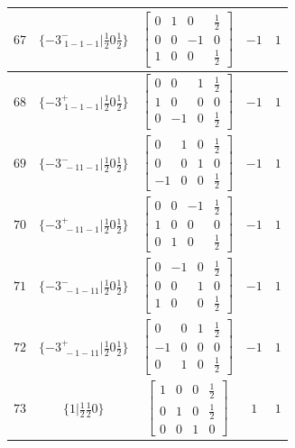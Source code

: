\documentclass[fleqn,8pt]{jsarticle}
\begin{document}
\begin{longtable}{ccccc}
$ 67 $ & $ \{-3^{-}_{\,\,1-1-1}|\frac{1}{2} 0 \frac{1}{2}\} $ & $ \begin{bmatrix} 0 & 1 & 0 & \frac{1}{2} \\ 0 & 0 & -1 & 0 \\ 1 & 0 & 0 & \frac{1}{2} \end{bmatrix} $ & $ -1 $ & $ 1 $ \\ \hline
$ 68 $ & $ \{-3^{+}_{\,\,1-1-1}|\frac{1}{2} 0 \frac{1}{2}\} $ & $ \begin{bmatrix} 0 & 0 & 1 & \frac{1}{2} \\ 1 & 0 & 0 & 0 \\ 0 & -1 & 0 & \frac{1}{2} \end{bmatrix} $ & $ -1 $ & $ 1 $ \\ \hline
$ 69 $ & $ \{-3^{-}_{\,\,-11-1}|\frac{1}{2} 0 \frac{1}{2}\} $ & $ \begin{bmatrix} 0 & 1 & 0 & \frac{1}{2} \\ 0 & 0 & 1 & 0 \\ -1 & 0 & 0 & \frac{1}{2} \end{bmatrix} $ & $ -1 $ & $ 1 $ \\ \hline
$ 70 $ & $ \{-3^{+}_{\,\,-11-1}|\frac{1}{2} 0 \frac{1}{2}\} $ & $ \begin{bmatrix} 0 & 0 & -1 & \frac{1}{2} \\ 1 & 0 & 0 & 0 \\ 0 & 1 & 0 & \frac{1}{2} \end{bmatrix} $ & $ -1 $ & $ 1 $ \\ \hline
$ 71 $ & $ \{-3^{-}_{\,\,-1-11}|\frac{1}{2} 0 \frac{1}{2}\} $ & $ \begin{bmatrix} 0 & -1 & 0 & \frac{1}{2} \\ 0 & 0 & 1 & 0 \\ 1 & 0 & 0 & \frac{1}{2} \end{bmatrix} $ & $ -1 $ & $ 1 $ \\ \hline
$ 72 $ & $ \{-3^{+}_{\,\,-1-11}|\frac{1}{2} 0 \frac{1}{2}\} $ & $ \begin{bmatrix} 0 & 0 & 1 & \frac{1}{2} \\ -1 & 0 & 0 & 0 \\ 0 & 1 & 0 & \frac{1}{2} \end{bmatrix} $ & $ -1 $ & $ 1 $ \\ \hline
$ 73 $ & $ \{1|\frac{1}{2} \frac{1}{2} 0\} $ & $ \begin{bmatrix} 1 & 0 & 0 & \frac{1}{2} \\ 0 & 1 & 0 & \frac{1}{2} \\ 0 & 0 & 1 & 0 \end{bmatrix} $ & $ 1 $ & $ 1 $ \\ \hline

\end{longtable}
\end{document}
